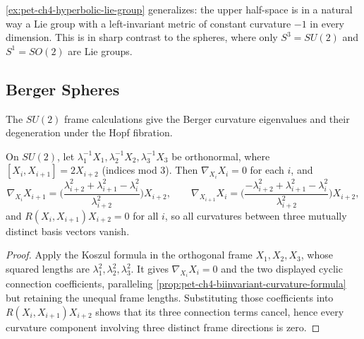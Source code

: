 \begin{remark}
  \label{rem:pet-ch4-lie-group-spheres-contrast}
  \cref{ex:pet-ch4-hyperbolic-lie-group} generalizes: the upper half-space is
  in a natural way a Lie group with a left-invariant metric of constant
  curvature $-1$ in every dimension. This is in sharp contrast to the spheres,
  where only $S^3=SU(2)$ and $S^1=SO(2)$ are Lie groups.
\end{remark}

\subsection{Berger Spheres}

The $SU(2)$ frame calculations give the Berger curvature eigenvalues and their
degeneration under the Hopf fibration.

\begin{example}
  \label{ex:pet-ch4-general-berger-metric}
  On $SU(2)$, let $\lambda_1^{-1}X_1,\lambda_2^{-1}X_2,\lambda_3^{-1}X_3$ be
  orthonormal, where $[X_i,X_{i+1}]=2X_{i+2}$ (indices mod $3$). Then
  $\nabla_{X_i}X_i=0$ for each $i$, and
  \[
    \nabla_{X_i}X_{i+1}=\Big(\frac{\lambda_{i+2}^2+\lambda_{i+1}^2-\lambda_i^2}{\lambda_{i+2}^2}\Big)X_{i+2},
    \qquad
    \nabla_{X_{i+1}}X_i=\Big(\frac{-\lambda_{i+2}^2+\lambda_{i+1}^2-\lambda_i^2}{\lambda_{i+2}^2}\Big)X_{i+2},
  \]
  and $R(X_i,X_{i+1})X_{i+2}=0$ for all $i$, so all curvatures between three
  mutually distinct basis vectors vanish.
\end{example}
\begin{proof}
  \sketch
  Apply the Koszul formula in the orthogonal frame $X_1,X_2,X_3$, whose squared
  lengths are $\lambda_1^2,\lambda_2^2,\lambda_3^2$. It gives
  $\nabla_{X_i}X_i=0$ and the two displayed cyclic connection coefficients,
  paralleling \cref{prop:pet-ch4-biinvariant-curvature-formula} but retaining
  the unequal frame lengths. Substituting those coefficients into
  $R(X_i,X_{i+1})X_{i+2}$ shows that its three connection terms cancel, hence
  every curvature component involving three distinct frame directions is zero.
\end{proof}


